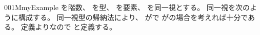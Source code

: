 \documentclass[index]{subfiles}
\begin{document}
\begin{myBlock}{001M}{myExample}
  を階数、
  を型、
  を要素、
  を同一視とする。
  同一視を次のように構成する。
  同一視型の帰納法により、
  がで
  がの場合を考えれば十分である。
  定義よりなので
  と定義する。
\end{myBlock}
\end{document}
